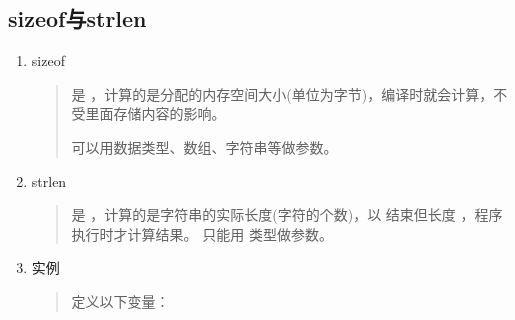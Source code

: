 \documentclass[letterpaper,10pt,english]{sphinxmanual}
\begin{document}
\subsection{sizeof与strlen}
\label{\detokenize{cpp/03_typeSize:sizeofstrlen}}\begin{enumerate}
\item {} 
sizeof
\begin{quote}

 是  ，计算的是分配的内存空间大小(单位为字节)，编译时就会计算，不受里面存储内容的影响。

 可以用数据类型、数组、字符串等做参数。
\end{quote}

\item {} 
strlen
\begin{quote}

 是  ，计算的是字符串的实际长度(字符的个数)，以  结束但长度   ，程序执行时才计算结果。
 只能用  类型做参数。
\end{quote}

\item {} 
实例
\begin{quote}

定义以下变量：


\end{quote}
\end{enumerate}
\end{document}
